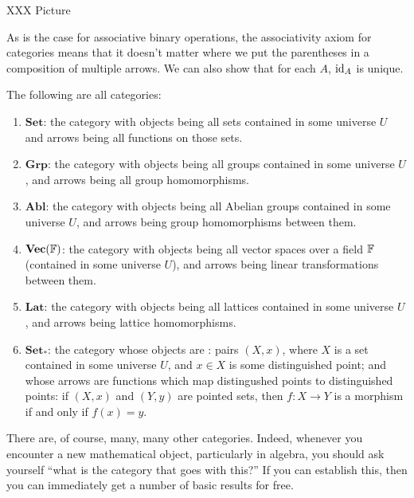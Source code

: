 XXX Picture

As is the case for associative binary operations, the associativity 
axiom for categories means that it doesn't matter where we put the 
parentheses in a composition of multiple arrows.  We can also show 
that for each $A$, $\text{id}_{A}$ is unique.

\begin{example}
  The following are all categories:
  \begin{enumerate}
    \item $\mathbf{Set}$: the category with objects being all sets 
    contained in some universe $U$ and arrows being all functions 
    on those sets.
    
    \item $\mathbf{Grp}$: the category with objects being all groups
    contained in some universe $U$, and arrows being all group
    homomorphisms.
    
    \item $\mathbf{Abl}$: the category with objects being all Abelian
    groups contained in some universe $U$, and arrows being group
    homomorphisms between them.
    
    \item $\mathbf{Vec}(\mathbb{F})$: the category with objects being all
    vector spaces over a field $\mathbb{F}$ (contained in some universe
    $U$), and arrows being linear transformations between them.
    
    \item $\mathbf{Lat}$: the category with objects being all lattices 
    contained in some universe $U$, and arrows being lattice 
    homomorphisms.
    
    \item $\mathbf{Set_{*}}$: the category whose objects are
    : pairs $(X,x)$, where $X$ is a
    set contained in some universe $U$, and $x \in X$ is some
    distinguished point; and whose arrows are functions which map
    distingushed points to distinguished points: if $(X, x)$ and $(Y,
    y)$ are pointed sets, then $f:X \to Y$ is a morphism if and only
    if $f(x) = y$.
  \end{enumerate}
\end{example}

There are, of course, many, many other categories.  Indeed, whenever 
you encounter a new mathematical object, particularly in algebra, you 
should ask yourself ``what is the category that goes with this?''  If 
you can establish this, then you can immediately get a number of basic 
results for free.

